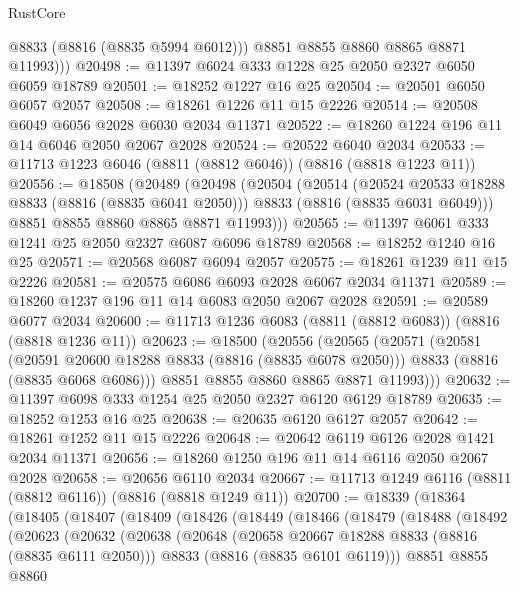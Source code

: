 \begin{lexlean}{RustCore}
\begin{coremodule}
            @8833
            (@8816 (@8835 @5994 @6012)))
          @8851
          @8855
          @8860
          @8865
          @8871
          @11993)))
@20498 := @11397 @6024 @333 @1228 @25 @2050 @2327 @6050 @6059 @18789
@20501 := @18252 @1227 @16 @25
@20504 := @20501 @6050 @6057 @2057
@20508 := @18261 @1226 @11 @15 @2226
@20514 := @20508 @6049 @6056 @2028 @6030 @2034 @11371
@20522 := @18260 @1224 @196 @11 @14 @6046 @2050 @2067 @2028
@20524 := @20522 @6040 @2034
@20533 := @11713 @1223 @6046 (@8811 (@8812 @6046)) (@8816 (@8818 @1223 @11))
@20556 := @18508
    (@20489
      (@20498
        (@20504
          (@20514
            (@20524 @20533 @18288 @8833 (@8816 (@8835 @6041 @2050)))
            @8833
            (@8816 (@8835 @6031 @6049)))
          @8851
          @8855
          @8860
          @8865
          @8871
          @11993)))
@20565 := @11397 @6061 @333 @1241 @25 @2050 @2327 @6087 @6096 @18789
@20568 := @18252 @1240 @16 @25
@20571 := @20568 @6087 @6094 @2057
@20575 := @18261 @1239 @11 @15 @2226
@20581 := @20575 @6086 @6093 @2028 @6067 @2034 @11371
@20589 := @18260 @1237 @196 @11 @14 @6083 @2050 @2067 @2028
@20591 := @20589 @6077 @2034
@20600 := @11713 @1236 @6083 (@8811 (@8812 @6083)) (@8816 (@8818 @1236 @11))
@20623 := @18500
    (@20556
      (@20565
        (@20571
          (@20581
            (@20591 @20600 @18288 @8833 (@8816 (@8835 @6078 @2050)))
            @8833
            (@8816 (@8835 @6068 @6086)))
          @8851
          @8855
          @8860
          @8865
          @8871
          @11993)))
@20632 := @11397 @6098 @333 @1254 @25 @2050 @2327 @6120 @6129 @18789
@20635 := @18252 @1253 @16 @25
@20638 := @20635 @6120 @6127 @2057
@20642 := @18261 @1252 @11 @15 @2226
@20648 := @20642 @6119 @6126 @2028 @1421 @2034 @11371
@20656 := @18260 @1250 @196 @11 @14 @6116 @2050 @2067 @2028
@20658 := @20656 @6110 @2034
@20667 := @11713 @1249 @6116 (@8811 (@8812 @6116)) (@8816 (@8818 @1249 @11))
@20700 := @18339
    (@18364
      (@18405
        (@18407
          (@18409
            (@18426
              (@18449
                (@18466
                  (@18479
                    (@18488
                      (@18492
                        (@20623
                          (@20632
                            (@20638
                              (@20648
                                (@20658 @20667 @18288 @8833 (@8816 (@8835 @6111 @2050)))
                                @8833
                                (@8816 (@8835 @6101 @6119)))
                              @8851
                              @8855
                              @8860

\end{coremodule}
\end{lexlean}
